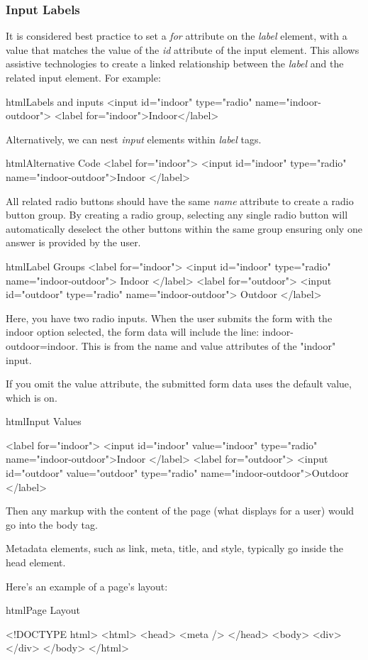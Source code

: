 \subsubsection{Input Labels}
It is considered best practice to set a \emph{for} attribute on the \emph{label} element, with a value that matches the value of the \emph{id} attribute of the input element. This allows assistive technologies to create a linked relationship between the \emph{label} and the related input element. For example:
\begin{codeBlock}{html}{Labels and inputs}
    <input id="indoor" type="radio" name="indoor-outdoor">
    <label for="indoor">Indoor</label>
\end{codeBlock}

Alternatively, we can nest \emph{input} elements within \emph{label} tags.
\begin{codeBlock}{html}{Alternative Code}
    <label for="indoor"> 
        <input id="indoor" type="radio" name="indoor-outdoor">Indoor 
    </label>
\end{codeBlock}

All related radio buttons should have the same \emph{name} attribute to create a radio button group. By creating a radio group, selecting any single radio button will automatically deselect the other buttons within the same group ensuring only one answer is provided by the user.

\begin{codeBlock}{html}{Label Groups}
<label for="indoor">
    <input id="indoor" type="radio" name="indoor-outdoor"> Indoor
</label>
<label for="outdoor">
    <input id="outdoor" type="radio" name="indoor-outdoor"> Outdoor
</label>    
\end{codeBlock}
Here, you have two radio inputs. When the user submits the form with the indoor option selected, the form data will include the line: indoor-outdoor=indoor. This is from the name and value attributes of the "indoor" input.

If you omit the value attribute, the submitted form data uses the default value, which is on. 

\begin{codeBlock}{html}{Input Values}

<label for="indoor">
  <input id="indoor" value="indoor" type="radio" name="indoor-outdoor">Indoor
</label>
<label for="outdoor">
  <input id="outdoor" value="outdoor" type="radio" name="indoor-outdoor">Outdoor
</label>
\end{codeBlock}

Then any markup with the content of the page (what displays for a user) would go into the body tag.

Metadata elements, such as link, meta, title, and style, typically go inside the head element.

Here's an example of a page's layout:
\begin{codeBlock}{html}{Page Layout}

<!DOCTYPE html>
<html>
  <head>
    <meta />
  </head>
  <body>
    <div>
    </div>
  </body>
</html>

\end{codeBlock}
